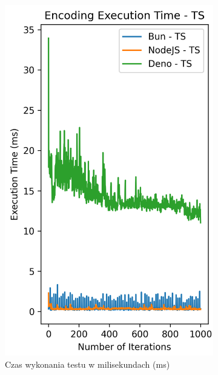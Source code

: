 \begin{figure}[H]
  \centering
  \begin{subfigure}[b]{0.4\textwidth}
    \centering
    \includegraphics[width=\textwidth]{Figures/coding/base64_1000_encoding_ts_time.png}
    \caption{Czas wykonania testu w milisekundach (ms)}
    \label{fig:encoding_e2_ts_time}
  \end{subfigure}
  \begin{subfigure}[b]{0.4\textwidth}
    \centering

\end{subfigure}
\end{figure}
